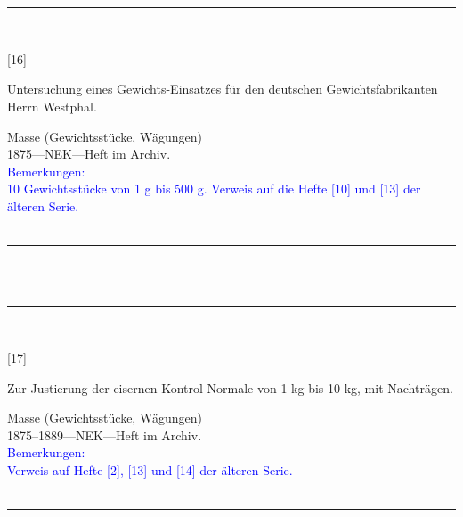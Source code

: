 \\
\vspace*{-2.5pt}\\
\parbox{\textwidth}{%
\rule{\textwidth}{1pt}\vspace*{-3mm}\\
\begin{minipage}[t]{0.15\textwidth}\vspace{0pt}
\Huge\rule[-4mm]{0cm}{1cm}[16]
\end{minipage}
\hfill
\begin{minipage}[t]{0.85\textwidth}\vspace{0pt}
\large Untersuchung eines Gewichts-Einsatzes für den deutschen Gewichtsfabrikanten Herrn {\glqq}Westphal{\grqq}.\rule[-2mm]{0mm}{2mm}
\end{minipage}
{\footnotesize\flushright
Masse (Gewichtsstücke, Wägungen)\\
}
1875\quad---\quad NEK\quad---\quad Heft im Archiv.\\
\textcolor{blue}{Bemerkungen:\\{}
10 Gewichtsstücke von 1 g bis 500 g. Verweis auf die Hefte [10] und [13] der älteren Serie.\\{}
}
\\[-15pt]
\rule{\textwidth}{1pt}
}
\\
\vspace*{-2.5pt}\\
\parbox{\textwidth}{%
\rule{\textwidth}{1pt}\vspace*{-3mm}\\
\begin{minipage}[t]{0.15\textwidth}\vspace{0pt}
\Huge\rule[-4mm]{0cm}{1cm}[17]
\end{minipage}
\hfill
\begin{minipage}[t]{0.85\textwidth}\vspace{0pt}
\large Zur Justierung der eisernen Kontrol-Normale von 1 kg bis 10 kg, mit Nachträgen.\rule[-2mm]{0mm}{2mm}
\end{minipage}
{\footnotesize\flushright
Masse (Gewichtsstücke, Wägungen)\\
}
1875--1889\quad---\quad NEK\quad---\quad Heft im Archiv.\\
\textcolor{blue}{Bemerkungen:\\{}
Verweis auf Hefte [2], [13] und [14] der älteren Serie.\\{}
}
\\[-15pt]
\rule{\textwidth}{1pt}
}
